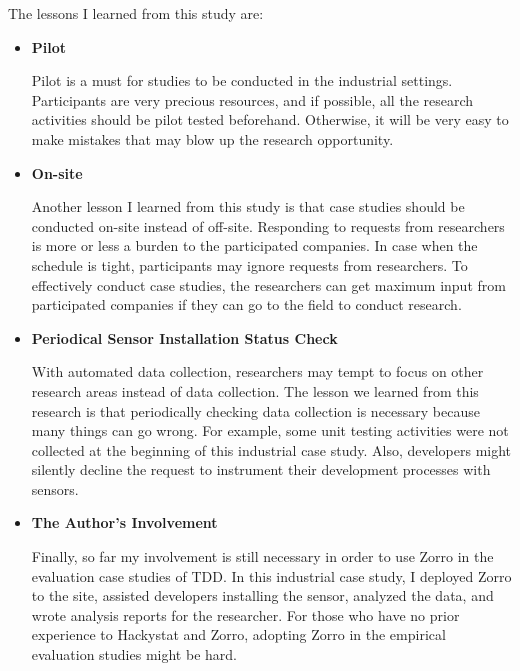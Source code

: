 The lessons I learned from this study are:
\begin{itemize}
\item{\textbf{Pilot}}

Pilot is a must for studies to be conducted in the industrial settings. Participants are very precious resources, and if possible, all the research activities should be pilot tested beforehand. Otherwise, it will be very easy to make mistakes that may blow up the research opportunity. %

\item{\textbf{On-site}}

Another lesson I learned from this study is that case studies should be conducted on-site instead of off-site. Responding to requests from researchers is more or less a burden to the participated companies. In case when the schedule is tight, participants may ignore requests from researchers. To effectively conduct case studies, the researchers can get maximum input from participated companies if they can go to the field to conduct research. 

\item{\textbf{Periodical Sensor Installation Status Check}}

With automated data collection, researchers may tempt to focus on other research areas instead of data collection. The lesson we learned from this research is that periodically checking data collection is necessary because many things can go wrong. For example, some unit testing activities were not collected at the beginning of this industrial case study. Also, developers might silently decline the request to instrument their development processes with sensors.

\item{\textbf{The Author's Involvement}}

Finally, so far my involvement is still necessary in order to use Zorro in the evaluation case studies of TDD. In this industrial case study, I deployed Zorro to the site, assisted developers installing the sensor, analyzed the data, and wrote analysis reports for the researcher. For those who have no prior experience to Hackystat and Zorro, adopting Zorro in the empirical evaluation studies might be hard. 

\end{itemize}
